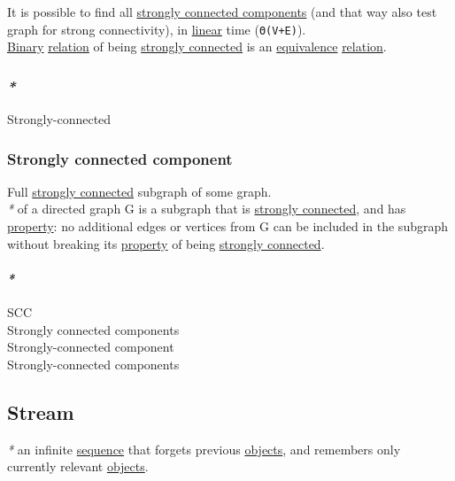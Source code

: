 \documentclass[11pt]{article}
\begin{document}
It is possible to find all \hyperref[orgf22479f]{strongly connected components} (and that way also test graph for strong connectivity), in \hyperref[orgbbe89e9]{linear} time (\texttt{Θ(V+E)}).\\

\hyperref[org57bd48f]{Binary} \hyperref[orga5705a9]{relation} of being \hyperref[org9753e4e]{strongly connected} is an \hyperref[orgbc0d2cd]{equivalence} \hyperref[orga5705a9]{relation}.\\

\subsubsection{\emph{*}}
\label{sec:org2dea85b}

\label{orgc8710e4}Strongly-connected\\

\subsubsection{\label{orge006d70}Strongly connected component}
\label{sec:org69a1269}
Full \hyperref[org9753e4e]{strongly connected} subgraph of some graph.\\

\emph{*} of a directed graph G is a subgraph that is \hyperref[org9753e4e]{strongly connected}, and has \hyperref[orgf8c3cc7]{property}: no additional edges or vertices from G can be included in the subgraph without breaking its \hyperref[orgf8c3cc7]{property} of being \hyperref[org9753e4e]{strongly connected}.\\

\paragraph{\emph{*}}
\label{sec:org552bb91}

\label{org778dbdb}SCC\\
\label{orgf22479f}Strongly connected components\\
\label{org03163fc}Strongly-connected component\\
\label{org2deac55}Strongly-connected components\\

\subsection{\label{orga8ddce6}Stream}
\label{sec:orgd800465}
\emph{*} an infinite \hyperref[org522d1b0]{sequence} that forgets previous \hyperref[org363acc2]{objects}, and remembers only currently relevant \hyperref[org363acc2]{objects}.\\
\end{document}
